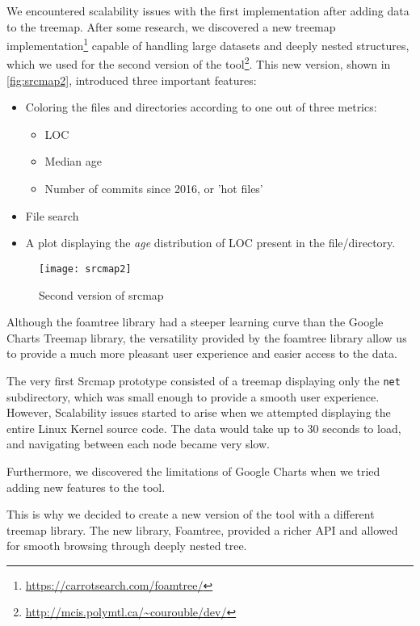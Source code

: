 We encountered scalability issues with the first implementation after adding data to the treemap.
After some research, we discovered a new treemap implementation\footnote{\url{https://carrotsearch.com/foamtree/}} capable of handling large datasets and deeply nested structures, which we used for the second version of the tool\footnote{\url{http://mcis.polymtl.ca/~courouble/dev/}}. This new version, shown in \autoref{fig:srcmap2}, introduced three important features: 
\begin{itemize}
	\item Coloring the files and directories according to one out of three metrics:
	\begin{itemize}
		\item \ac{LOC}
		\item Median age
		\item Number of commits since 2016, or 'hot files'
	\end{itemize}
	\item File search
	\item A plot displaying the \textit{age} distribution of \ac{LOC} present in the file/directory.
\end{itemize}

\begin{figure}[htb]
\centering
\texttt{[image: srcmap2]}
\caption{Second version of srcmap}
\label{fig:srcmap2}
\end{figure}

Although the foamtree library had a steeper learning curve than the Google Charts Treemap library, the versatility provided by the foamtree library allow us to provide a much more pleasant user experience and easier access to the data.


The very first Srcmap prototype consisted of a treemap displaying only the \texttt{net} subdirectory, which was small enough to provide a smooth user experience. However, Scalability issues started to arise when we attempted displaying the entire Linux Kernel source code. The data would take up to 30 seconds to load, and navigating between each node became very slow.


Furthermore, we discovered the limitations of Google Charts when we tried adding new features to the tool.


This is why we decided to create a new version of the tool with a different treemap library. The new library, Foamtree, provided a richer API and allowed for smooth browsing through deeply nested tree.





